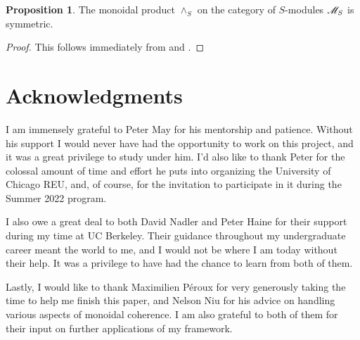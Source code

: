 \documentclass[openany, amssymb, psamsfonts]{amsart}
\theoremstyle{definition}
\newtheorem{prop}{Proposition}[section]
\numberwithin{equation}{section}
\begin{document}
\begin{prop}
    The monoidal product $\wedge_S$ on the category of $S$-modules $\mathscr{M}_S$ is symmetric.
\end{prop}
\begin{proof}
    This follows immediately from  and .
\end{proof}

\section*{Acknowledgments}

I am immensely grateful to Peter May for his mentorship and patience. Without his support I would never have had the opportunity to work on this project, and it was a great privilege to study under him. I'd also like to thank Peter for the colossal amount of time and effort he puts into organizing the University of Chicago REU, and, of course, for the invitation to participate in it during the Summer 2022 program.

I also owe a great deal to both David Nadler and Peter Haine for their support during my time at UC Berkeley. Their guidance throughout my undergraduate career meant the world to me, and I would not be where I am today without their help. It was a privilege to have had the chance to learn from both of them.

Lastly, I would like to thank Maximilien Péroux for very generously taking the time to help me finish this paper, and Nelson Niu for his advice on handling various aspects of monoidal coherence. I am also grateful to both of them for their input on further applications of my framework.

\nocite{*}

\newpage
\printbibliography
\end{document}
